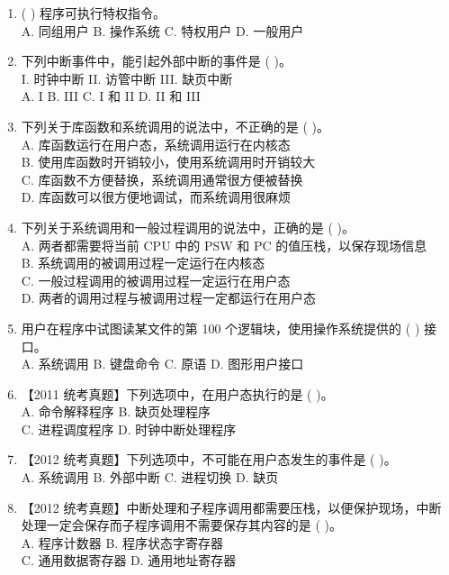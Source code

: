 \documentclass[lang=cn,newtx,10pt,scheme=chinese]{../../elegantbook}
\begin{document}
\begin{enumerate}
    \item (    ) 程序可执行特权指令。\\
    A. 同组用户 \quad B. 操作系统 \quad C. 特权用户 \quad D. 一般用户

    \item 下列中断事件中，能引起外部中断的事件是 (    )。\\
    I. 时钟中断 \quad II. 访管中断 \quad III. 缺页中断\\
    A. I \quad B. III \quad C. I 和 II \quad D. II 和 III

    \item 下列关于库函数和系统调用的说法中，不正确的是 (    )。\\
    A. 库函数运行在用户态，系统调用运行在内核态\\
    B. 使用库函数时开销较小，使用系统调用时开销较大\\
    C. 库函数不方便替换，系统调用通常很方便被替换\\
    D. 库函数可以很方便地调试，而系统调用很麻烦

    \item 下列关于系统调用和一般过程调用的说法中，正确的是 (    )。\\
    A. 两者都需要将当前 CPU 中的 PSW 和 PC 的值压栈，以保存现场信息\\
    B. 系统调用的被调用过程一定运行在内核态\\
    C. 一般过程调用的被调用过程一定运行在用户态\\
    D. 两者的调用过程与被调用过程一定都运行在用户态

    \item 用户在程序中试图读某文件的第 100 个逻辑块，使用操作系统提供的 (    ) 接口。\\
    A. 系统调用 \quad B. 键盘命令 \quad C. 原语 \quad D. 图形用户接口

    \item 【2011 统考真题】下列选项中，在用户态执行的是 (    )。\\
    A. 命令解释程序 \quad B. 缺页处理程序\\
    C. 进程调度程序 \quad D. 时钟中断处理程序

    \item 【2012 统考真题】下列选项中，不可能在用户态发生的事件是 (    )。\\
    A. 系统调用 \quad B. 外部中断 \quad C. 进程切换 \quad D. 缺页

    \item 【2012 统考真题】中断处理和子程序调用都需要压栈，以便保护现场，中断处理一定会保存而子程序调用不需要保存其内容的是 (    )。\\
    A. 程序计数器 \quad B. 程序状态字寄存器\\
    C. 通用数据寄存器 \quad D. 通用地址寄存器


\end{enumerate}
\end{document}

